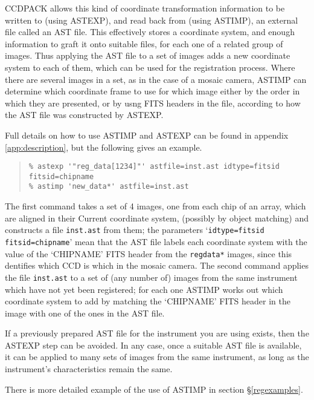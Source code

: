 \documentclass[twoside,11pt]{article}
\newcommand{\hyperref}[4]{#2\ref{#4}#3}
\newcommand{\htmlref}[2]{#1}
\renewcommand{\_}{\texttt{\symbol{95}}}
\newenvironment{myquote}{\begin{quote}\begin{small}}{\end{small}\end{quote}}
\newcommand{\text}[1]{{\small \tt #1}}
\newcommand{\routine}[1]{{\sc #1}}
\newcommand{\xroutine}[1]{\htmlref{{\sc #1}}{#1}}
\begin{document}
CCDPACK allows this kind of coordinate transformation information to 
be written to (using \routine{ASTEXP}), 
and read back from (using \routine{ASTIMP}),
an external file called an AST file.
This effectively stores a coordinate system, and enough information
to graft it onto suitable files, for each one of a related group
of images.
Thus applying the AST file to a set of images adds a new 
coordinate system to
each of them, which can be used for the registration process.
Where there are several images in a set, as in the case of 
a mosaic camera, \routine{ASTIMP} can determine which coordinate frame to
use for which image either by the order in which they are presented,
or by usng FITS headers in the file, 
according to how the AST file was constructed by \routine{ASTEXP}.

Full details on how to use \xroutine{ASTIMP} and \xroutine{ASTEXP}
can be found in \hyperref{an appendix}{appendix }{}{app:description},
but the following gives an example.
\begin{myquote}
\begin{verbatim}
% astexp '"reg_data[1234]"' astfile=inst.ast idtype=fitsid fitsid=chipname
% astimp 'new_data*' astfile=inst.ast
\end{verbatim}
\end{myquote}
The first command takes a set of 4 images, one from each chip of an array,
which are aligned in their Current coordinate system, 
(possibly by object matching)
and constructs a file \text{inst.ast} from them;
the parameters `\text{idtype=fitsid fitsid=chipname}' 
mean that the AST file labels each coordinate system with the
value of the `CHIPNAME' FITS header from the \text{reg\_data*} images,
since this dentifies which CCD is which in the mosaic camera.
The second command applies the file \text{inst.ast}
to a set of (any number of) images from the same 
instrument which have not yet been registered;
for each one \routine{ASTIMP} works out which coordinate system to 
add by matching the `CHIPNAME' FITS header in the image with one of 
the ones in the AST file.

If a previously prepared AST file for the instrument you are using
exists, then the \routine{ASTEXP} step can be avoided.
In any case, once a suitable AST file is available, 
it can be applied to many sets of images from the same instrument,
as long as the instrument's characteristics remain the same.

There is more detailed example of the use of \routine{ASTIMP} in 
section \S\ref{regexamples}.
\end{document}
